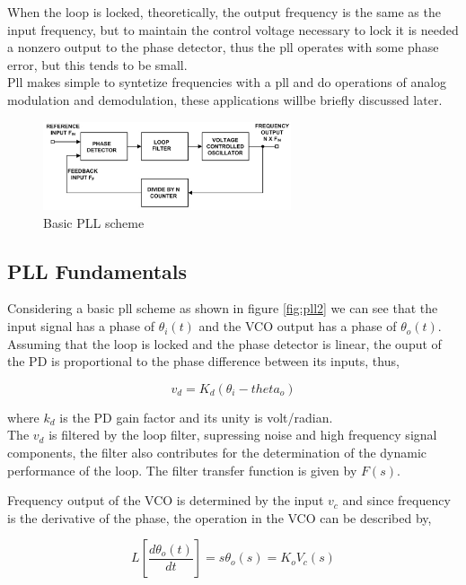 When the loop is locked, theoretically, the output frequency is the same as the
input frequency, but to maintain the control voltage necessary to lock it is
needed a nonzero output to the phase detector, thus the pll operates with some
phase error, but this tends to be small.\\

Pll makes simple to syntetize frequencies with a pll and do operations
of analog modulation and demodulation, these applications willbe briefly
discussed later.


\begin{figure}[htbp]
    \centering
    \includegraphics[width=0.65\textwidth]{./figures/pll.eps}
    \caption{ Basic PLL scheme
    \label{fig:pll}}
\end{figure}

\subsection{PLL Fundamentals}
Considering a basic pll scheme as shown in figure \ref{fig:pll2} we can see that
the input signal has a phase of $\theta_i(t)$ and the VCO output has a phase of
$\theta_o(t)$. Assuming that the loop is locked and the phase detector is
linear, the ouput of the PD is proportional to the phase difference between its
inputs, thus,

\begin{equation}
    v_d = K_d(\theta_i - theta_o)
    \label{eq:pdout}
\end{equation}

where $k_d$ is the PD gain factor and its unity is volt/radian.\\

The $v_d$ is filtered by the loop filter, supressing noise and high frequency
signal components, the filter also contributes for the determination of the
dynamic performance of the loop. The filter transfer function is given by
$F(s)$.

Frequency output of the VCO is determined by the input $v_c$ and since frequency
is the derivative of the phase, the operation in the VCO can be described by,

\begin{equation}
    L[\frac{d\theta_o(t)}{dt}] = s\theta_o(s)=K_oV_c(s)
    \label{eq:vco}
\end{equation}

